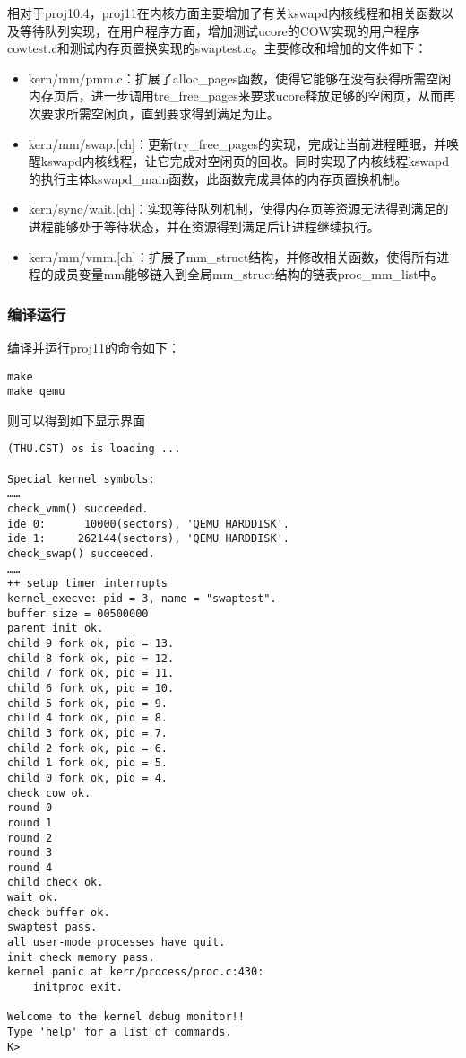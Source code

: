 相对于proj10.4，proj11在内核方面主要增加了有关kswapd内核线程和相关函数以及等待队列实现，在用户程序方面，增加测试ucore的COW实现的用户程序cowtest.c和测试内存页置换实现的swaptest.c。主要修改和增加的文件如下：

\begin{itemize}
\tightlist
\item
  kern/mm/pmm.c：扩展了alloc\_pages函数，使得它能够在没有获得所需空闲内存页后，进一步调用tre\_free\_pages来要求ucore释放足够的空闲页，从而再次要求所需空闲页，直到要求得到满足为止。
\item
  kern/mm/swap.{[}ch{]}：更新try\_free\_pages的实现，完成让当前进程睡眠，并唤醒kswapd内核线程，让它完成对空闲页的回收。同时实现了内核线程kswapd的执行主体kswapd\_main函数，此函数完成具体的内存页置换机制。
\item
  kern/sync/wait.{[}ch{]}：实现等待队列机制，使得内存页等资源无法得到满足的进程能够处于等待状态，并在资源得到满足后让进程继续执行。
\item
  kern/mm/vmm.{[}ch{]}：扩展了mm\_struct结构，并修改相关函数，使得所有进程的成员变量mm能够链入到全局mm\_struct结构的链表proc\_mm\_list中。
\end{itemize}

\subsubsection{编译运行}\label{ux7f16ux8bd1ux8fd0ux884c}

编译并运行proj11的命令如下：

\begin{lstlisting}
make
make qemu
\end{lstlisting}

则可以得到如下显示界面

\begin{lstlisting}
(THU.CST) os is loading ...

Special kernel symbols:
……
check_vmm() succeeded.
ide 0:      10000(sectors), 'QEMU HARDDISK'.
ide 1:     262144(sectors), 'QEMU HARDDISK'.
check_swap() succeeded.
……
++ setup timer interrupts
kernel_execve: pid = 3, name = "swaptest".
buffer size = 00500000
parent init ok.
child 9 fork ok, pid = 13.
child 8 fork ok, pid = 12.
child 7 fork ok, pid = 11.
child 6 fork ok, pid = 10.
child 5 fork ok, pid = 9.
child 4 fork ok, pid = 8.
child 3 fork ok, pid = 7.
child 2 fork ok, pid = 6.
child 1 fork ok, pid = 5.
child 0 fork ok, pid = 4.
check cow ok.
round 0
round 1
round 2
round 3
round 4
child check ok.
wait ok.
check buffer ok.
swaptest pass.
all user-mode processes have quit.
init check memory pass.
kernel panic at kern/process/proc.c:430:
    initproc exit.

Welcome to the kernel debug monitor!!
Type 'help' for a list of commands.
K>
\end{lstlisting}

